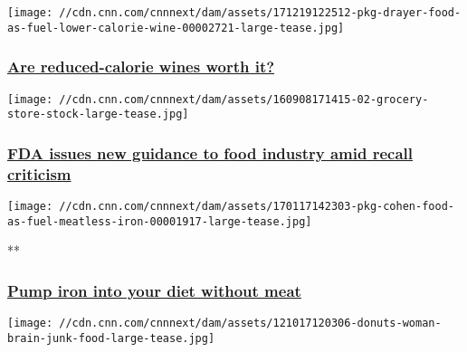 \href{/2017/12/21/health/reduced-calorie-wine-food-drayer/index.html}{}

\texttt{[image: //cdn.cnn.com/cnnnext/dam/assets/171219122512-pkg-drayer-food-as-fuel-lower-calorie-wine-00002721-large-tease.jpg]}

\hypertarget{are-reduced-calorie-wines-worth-it}{%
\subsubsection{\texorpdfstring{\href{/2017/12/21/health/reduced-calorie-wine-food-drayer/index.html}{Are
reduced-calorie wines worth
it?}}{Are reduced-calorie wines worth it?}}\label{are-reduced-calorie-wines-worth-it}}

\href{/2018/01/04/health/fda-food-guidance-criticism/index.html}{}

\texttt{[image: //cdn.cnn.com/cnnnext/dam/assets/160908171415-02-grocery-store-stock-large-tease.jpg]}

\hypertarget{fda-issues-new-guidance-to-food-industry-amid-recall-criticism}{%
\subsubsection{\texorpdfstring{\href{/2018/01/04/health/fda-food-guidance-criticism/index.html}{FDA
issues new guidance to food industry amid recall
criticism}}{FDA issues new guidance to food industry amid recall criticism}}\label{fda-issues-new-guidance-to-food-industry-amid-recall-criticism}}

\href{/videos/health/2017/01/26/pkg-cohen-faf-food-as-fuel-meatless-iron.cnn}{}

\texttt{[image: //cdn.cnn.com/cnnnext/dam/assets/170117142303-pkg-cohen-food-as-fuel-meatless-iron-00001917-large-tease.jpg]}

**

\hypertarget{pump-iron-into-your-diet-without-meat}{%
\subsubsection{\texorpdfstring{\href{/videos/health/2017/01/26/pkg-cohen-faf-food-as-fuel-meatless-iron.cnn}{Pump
iron into your diet without
meat}}{Pump iron into your diet without meat}}\label{pump-iron-into-your-diet-without-meat}}

\href{/2018/01/02/health/body-fights-dieting-food-partner/index.html}{}

\texttt{[image: //cdn.cnn.com/cnnnext/dam/assets/121017120306-donuts-woman-brain-junk-food-large-tease.jpg]}

